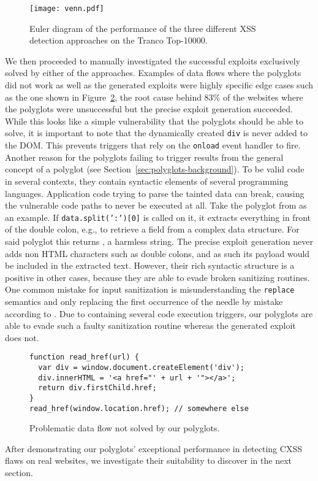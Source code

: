\begin{figure}
    \centering
    
    \texttt{[image: venn.pdf]}\vspace{-1.5mm}%
    \caption{Euler diagram of the performance of the three different XSS detection approaches on the Tranco Top-\num{10000}.}%
    \label{fig:client-side-xss-venn}
\end{figure}

We then proceeded to manually investigated the successful exploits exclusively solved by either of the approaches.
Examples of data flows where the polyglots did not work as well as the generated exploits were highly specific edge cases such as the one shown in Figure~\ref{lst:tainting-gen-sample}, the root cause behind 83\% of the websites where the polyglots were unsuccessful but the precise exploit generation succeeded. 
While this looks like a simple \xss{} vulnerability that the polyglots should be able to solve, it is important to note that the dynamically created \texttt{div} is never added to the DOM\@. 
This prevents triggers that rely on the \texttt{onload} event handler to fire.
Another reason for the polyglots failing to trigger results from the general concept of a polyglot (see Section~\ref{sec:polyglots-background}).
To be valid code in several contexts, they contain syntactic elements of several programming languages.
Application code trying to parse the tainted data can break, causing the vulnerable code paths to never be executed at all.
Take the polyglot from  as an example.
If \texttt{data.split(':')[0]} is called on it, it extracts everything in front of the double colon, e.g., to retrieve a field from a complex data structure.
For said polyglot this returns , a harmless string.
The precise exploit generation never adds non HTML characters such as double colons, and as such its payload would be included in the extracted text. %
However, their rich syntactic structure is a positive in other cases, because they are able to evade broken sanitizing routines.
One common mistake for input sanitization is misunderstanding the \texttt{replace} semantics and only replacing the first occurrence of the needle by mistake according to \citet{KleBarBen+22}.
Due to containing several code execution triggers, our polyglots are able to evade such a faulty sanitization routine whereas the generated exploit does not.

\begin{figure}[htb]
  \begin{verbatim}
function read_href(url) {
  var div = window.document.createElement('div');
  div.innerHTML = '<a href="' + url + '"></a>';
  return div.firstChild.href;
}
read_href(window.location.href); // somewhere else
\end{verbatim}
%
\caption{Problematic data flow not solved by our polyglots.}%
%
\label{lst:tainting-gen-sample}
\end{figure}



After demonstrating our polyglots' exceptional performance in detecting CXSS flaws on real websites, we investigate their suitability to discover \blindxss{} in the next section.
